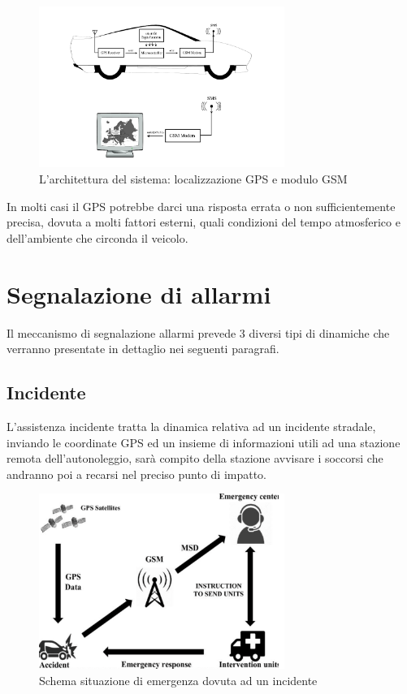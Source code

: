 \documentclass[12pt, a4paper, italian]{report}
\numberwithin{figure}{chapter}
\numberwithin{table}{chapter}
\begin{document}
\begin{figure}[h] \centering
\includegraphics[width=8cm]{tracking.png}
\caption{L'architettura del sistema: localizzazione GPS e modulo GSM\protect\footnotemark}
\label{fig:qualcosa}
\end{figure}

In molti casi il GPS potrebbe darci una risposta errata o non sufficientemente precisa, dovuta a molti fattori esterni, quali condizioni del tempo atmosferico e dell'ambiente che circonda il veicolo.

\section{Segnalazione di allarmi}
Il meccanismo di segnalazione allarmi prevede 3 diversi tipi di dinamiche che verranno presentate in dettaglio nei seguenti paragrafi. 
\subsection{Incidente}
L'assistenza incidente tratta la dinamica relativa ad un incidente stradale, inviando le coordinate GPS ed un insieme di informazioni utili ad una stazione remota dell'autonoleggio, sarà compito della stazione avvisare i soccorsi che andranno poi a recarsi nel preciso punto di impatto. 
\begin{figure}[h] \centering
\includegraphics[width=8cm]{incidente.png}
\caption{Schema situazione di emergenza dovuta ad un incidente\protect\footnotemark}
\label{fig:qualcosa}
\end{figure}
\end{document}
